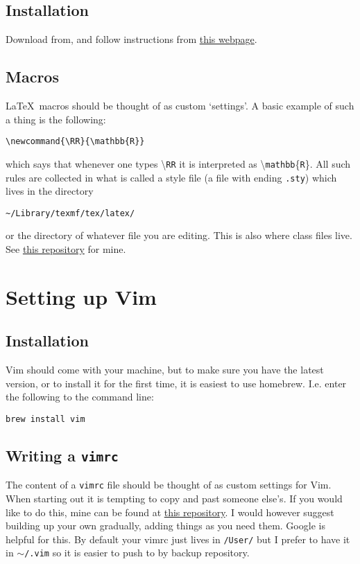 \documentclass{amsart}
\begin{document}
\subsection{Installation}

Download from, and follow instructions from \href{http://www.tug.org/mactex/}{this
webpage}.

\subsection{Macros}

\LaTeX\ macros should be thought of as custom `settings'. A basic example of such a thing
is the following:
\begin{verbatim}
\newcommand{\RR}{\mathbb{R}}
\end{verbatim}
which says that whenever one types \textbackslash\texttt{RR}
it is interpreted as \textbackslash\texttt{mathbb}\{\texttt{R}\}. All such rules are collected in what
is called a style file (a file with ending \texttt{.sty}) which lives in the directory 
\begin{verbatim}
~/Library/texmf/tex/latex/
\end{verbatim}
or the directory of whatever file you are editing. This is also where class files live.
See \href{https://github.com/jacksontvd/tex/tree/master/tex/latex}{this repository} for
mine.

\section{Setting up Vim}

\subsection{Installation}

Vim should come with your machine, but to make sure you have the latest version, or to
install it for the first time, it is easiest to use homebrew. I.e. enter the following to
the command line:
\begin{verbatim}
brew install vim
\end{verbatim}

\subsection{Writing a \texttt{vimrc}}

The content of a \texttt{vimrc} file should be thought of as custom settings for Vim.
When starting out it is tempting to copy and past someone else's. If you would like to do
this, mine can be found at \href{https://github.com/jacksontvd/vim}{this repository}. I
would however suggest building up your own gradually, adding things as you need them.
Google is helpful for this. 
By default your vimrc just lives in \texttt{/User/} but I prefer to have it in 
$\sim$\texttt{/.vim} so it is easier to push to by backup repository.
\end{document}

